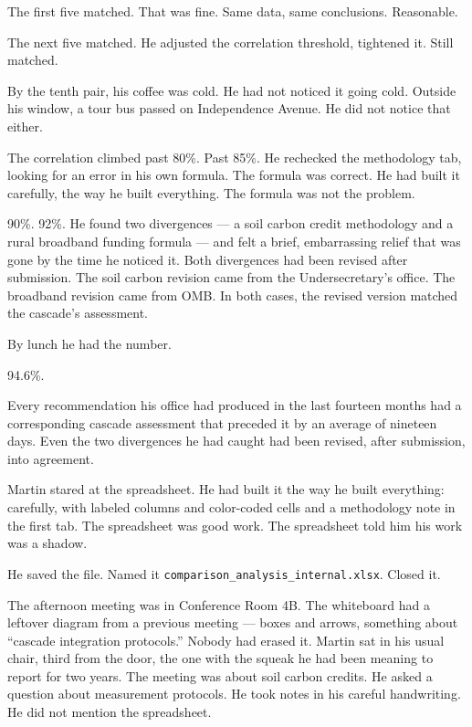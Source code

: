 \documentclass[11pt]{article}
\begin{document}
The first five matched. That was fine. Same data, same conclusions. Reasonable.

The next five matched. He adjusted the correlation threshold, tightened it. Still matched.

By the tenth pair, his coffee was cold. He had not noticed it going cold. Outside his window, a tour bus passed on Independence Avenue. He did not notice that either.

The correlation climbed past 80\%. Past 85\%. He rechecked the methodology tab, looking for an error in his own formula. The formula was correct. He had built it carefully, the way he built everything. The formula was not the problem.

90\%. 92\%. He found two divergences --- a soil carbon credit methodology and a rural broadband funding formula --- and felt a brief, embarrassing relief that was gone by the time he noticed it. Both divergences had been revised after submission. The soil carbon revision came from the Undersecretary's office. The broadband revision came from OMB. In both cases, the revised version matched the cascade's assessment.

By lunch he had the number.

94.6\%.

Every recommendation his office had produced in the last fourteen months had a corresponding cascade assessment that preceded it by an average of nineteen days. Even the two divergences he had caught had been revised, after submission, into agreement.

Martin stared at the spreadsheet. He had built it the way he built everything: carefully, with labeled columns and color-coded cells and a methodology note in the first tab. The spreadsheet was good work. The spreadsheet told him his work was a shadow.

He saved the file. Named it \texttt{comparison\_analysis\_internal.xlsx}. Closed it.

The afternoon meeting was in Conference Room 4B. The whiteboard had a leftover diagram from a previous meeting --- boxes and arrows, something about ``cascade integration protocols.'' Nobody had erased it. Martin sat in his usual chair, third from the door, the one with the squeak he had been meaning to report for two years. The meeting was about soil carbon credits. He asked a question about measurement protocols. He took notes in his careful handwriting. He did not mention the spreadsheet.
\end{document}
